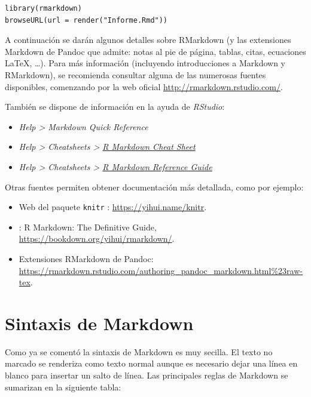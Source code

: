 \documentclass[
]{book}
\theoremstyle{break}
\theoremstyle{nonumberplain}
\begin{document}
\begin{verbatim}
library(rmarkdown)
browseURL(url = render("Informe.Rmd"))
\end{verbatim}

A continuación se darán algunos detalles sobre RMarkdown (y las extensiones Markdown de Pandoc que admite: notas al pie de página, tablas, citas, ecuaciones LaTeX, \ldots).
Para más información (incluyendo introducciones a Markdown y RMarkdown), se recomienda consultar alguna de las numerosas fuentes disponibles, comenzando por la web oficial \url{http://rmarkdown.rstudio.com/}.

También se dispone de información en la ayuda de \emph{RStudio}:

\begin{itemize}
\item
  \emph{Help \textgreater{} Markdown Quick Reference}
\item
  \emph{Help \textgreater{} Cheatsheets \textgreater{} \href{https://www.rstudio.org/links/r_markdown_cheat_sheet}{R Markdown Cheat Sheet}}
\item
  \emph{Help \textgreater{} Cheatsheets \textgreater{} \href{https://www.rstudio.com/wp-content/uploads/2015/03/rmarkdown-reference.pdf}{R Markdown Reference Guide}}
\end{itemize}

Otras fuentes permiten obtener documentación más detallada, como por ejemplo:

\begin{itemize}
\item
  Web del paquete \texttt{knitr} \citep{R-knitr}: \url{https://yihui.name/knitr}.
\item
  \citet{xie2018r} : R Markdown: The Definitive Guide,
  \url{https://bookdown.org/yihui/rmarkdown/}.
\item
  Extensiones RMarkdown de Pandoc: \url{https://rmarkdown.rstudio.com/authoring_pandoc_markdown.html\%23raw-tex}.
\end{itemize}

\hypertarget{markdown}{%
\section{Sintaxis de Markdown}\label{markdown}}

Como ya se comentó la sintaxis de Markdown es muy secilla.
El texto no marcado se renderiza como texto normal aunque es necesario dejar una línea en blanco para insertar un salto de línea.
Las principales reglas de Markdown se sumarizan en la siguiente tabla:
\end{document}
